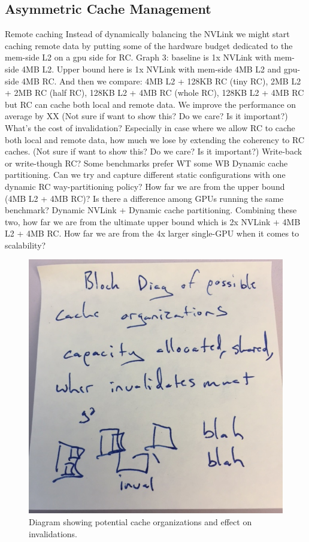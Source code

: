 \subsection{Asymmetric Cache Management}

Remote caching
Instead of dynamically balancing the NVLink we might start caching remote data by putting some of the hardware budget dedicated to the mem-side L2 on a gpu side for RC. 
Graph 3: baseline is 1x NVLink with mem-side 4MB L2. Upper bound here is 1x NVLink with mem-side 4MB L2 and gpu-side 4MB RC. And then we compare: 4MB L2 + 128KB RC (tiny RC), 2MB L2 + 2MB RC (half RC), 128KB L2 + 4MB RC (whole RC), 128KB L2 + 4MB RC but RC can cache both local and remote data. We improve the performance on average by XX%
(Not sure if want to show this? Do we care? Is it important?) What’s the cost of invalidation? Especially in case where we allow RC to cache both local and remote data, how much we lose by extending the coherency to RC caches. 
(Not sure if want to show this? Do we care? Is it important?) Write-back or write-though RC? Some benchmarks prefer WT some WB
Dynamic cache partitioning. Can we try and capture different static configurations with one dynamic RC way-partitioning policy? How far we are from the upper bound (4MB L2 + 4MB RC)? Is there a difference among GPUs running the same benchmark? 
Dynamic NVLink + Dynamic cache partitioning. Combining these two, how far we are from the ultimate upper bound which is 2x NVLink + 4MB L2 + 4MB RC. How far we are from the 4x larger single-GPU when it comes to scalability?

\begin{figure}[tp]
    \centering
    \includegraphics[width=0.9\columnwidth]{figures/cacheorg.jpg}
    \caption{Diagram showing potential cache organizations and effect on invalidations.}
    \label{fig:cacheorg}
\end{figure}



